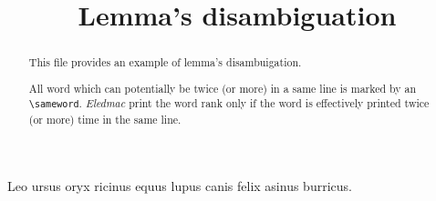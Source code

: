 \documentclass{article}
\begin{document}
\begin{english}
\date{}
\title{Lemma's disambiguation}
\maketitle


\begin{abstract}
This file provides an example of lemma's disambuigation. 

All word which can potentially be twice (or more) in a same line is marked by an \verb+\sameword+. \emph{Eledmac} print the word rank only if the word is effectively printed twice (or more) time in the same line. 
\end{abstract}
\end{english}




\begin{ledgroup}
\beginnumbering
\pstart
Leo  ursus  oryx  ricinus  equus 
lupus  canis  felix  asinus  burricus.

\pend
\endnumbering
\end{ledgroup}
\end{document}
